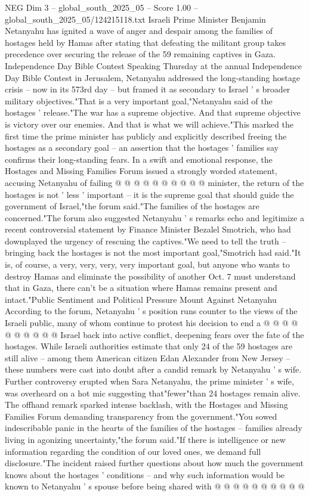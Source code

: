 \begin{textsample}{NEG Dim 3 – global\_south\_2025\_05 – Score 1.00 – global\_south\_2025\_05/124215118.txt}  \label{ex:f3_neg_221}
Israeli Prime Minister Benjamin Netanyahu has ignited a wave of anger and despair among the families of hostages held by Hamas after stating that defeating the militant group takes precedence over securing the release of the 59 remaining captives in Gaza.
Independence Day Bible Contest Speaking Thursday at the annual Independence Day Bible Contest in Jerusalem, Netanyahu addressed the long-standing hostage crisis -- now in its 573rd day -- but framed it as secondary to Israel ' s broader military objectives."That is a very important goal,"Netanyahu said of the hostages ' release."The war has a supreme objective.
And that supreme objective is victory over our enemies.
And that is what we will achieve."This marked the first time the prime minister has publicly and explicitly described freeing the hostages as a secondary goal -- an assertion that the hostages ' families say confirms their long-standing fears.
In a swift and emotional response, the Hostages and Missing Families Forum issued a strongly worded statement, accusing Netanyahu of failing @ @ @ @ @ @ @ @ @ @ minister, the return of the hostages is not ' less ' important -- it is the supreme goal that should guide the government of Israel,"the forum said."The families of the hostages are concerned."The forum also suggested Netanyahu ' s remarks echo and legitimize a recent controversial statement by Finance Minister Bezalel Smotrich, who had downplayed the urgency of rescuing the captives."We need to tell the truth -- bringing back the hostages is not the most important goal,"Smotrich had said."It is, of course, a very, very, very, very important goal, but anyone who wants to destroy Hamas and eliminate the possibility of another Oct. 7 must understand that in Gaza, there can't be a situation where Hamas remains present and intact."Public Sentiment and Political Pressure Mount Against Netanyahu According to the forum, Netanyahu ' s position runs counter to the views of the Israeli public, many of whom continue to protest his decision to end a @ @ @ @ @ @ @ @ @ @ Israel back into active conflict, deepening fears over the fate of the hostages.
While Israeli authorities estimate that only 24 of the 59 hostages are still alive -- among them American citizen Edan Alexander from New Jersey -- these numbers were cast into doubt after a candid remark by Netanyahu ' s wife.
Further controversy erupted when Sara Netanyahu, the prime minister ' s wife, was overheard on a hot mic suggesting that"fewer"than 24 hostages remain alive.
The offhand remark sparked intense backlash, with the Hostages and Missing Families Forum demanding transparency from the government."You sowed indescribable panic in the hearts of the families of the hostages -- families already living in agonizing uncertainty,"the forum said."If there is intelligence or new information regarding the condition of our loved ones, we demand full disclosure."The incident raised further questions about how much the government knows about the hostages ' conditions -- and why such information would be known to Netanyahu ' s spouse before being shared with @ @ @ @ @ @ @ @ @ @

\end{textsample}
